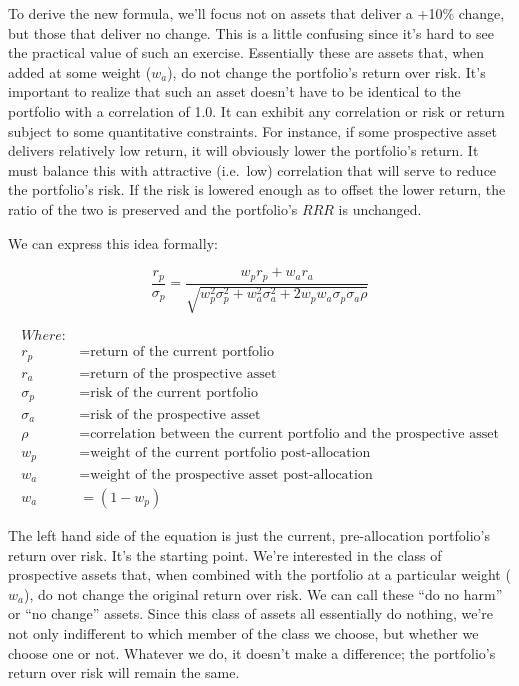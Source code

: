 \documentclass[]{article}
\begin{document}
To derive the new formula, we'll focus not on assets that deliver a
+10\% change, but those that deliver no change. This is a little
confusing since it's hard to see the practical value of such an
exercise. Essentially these are assets that, when added at some weight
(\(w_a\)), do not change the portfolio's return over risk. It's
important to realize that such an asset doesn't have to be identical to
the portfolio with a correlation of 1.0. It can exhibit any correlation
or risk or return subject to some quantitative constraints. For
instance, if some prospective asset delivers relatively low return, it
will obviously lower the portfolio's return. It must balance this with
attractive (i.e.~low) correlation that will serve to reduce the
portfolio's risk. If the risk is lowered enough as to offset the lower
return, the ratio of the two is preserved and the portfolio's \(RRR\) is
unchanged.

We can express this idea formally:

\[
\frac{r_p}{\sigma_p} = \frac{w_p r_p + w_a r_a}
{\sqrt{w_p^2 \sigma_p^2 + w_a^2 \sigma_a^2 + 2 w_p w_a \sigma_p \sigma_a \rho}}
\]

\[
\begin{aligned}
Where: & \\
r_p & = \text{return of the current portfolio} \\
r_a & = \text{return of the prospective asset} \\
\sigma_p & = \text{risk of the current portfolio} \\
\sigma_a & = \text{risk of the prospective asset} \\
\rho & = \text{correlation between the current portfolio and the prospective asset} \\
w_p & = \text{weight of the current portfolio post-allocation} \\
w_a & = \text{weight of the prospective asset post-allocation} \\
w_a & = (1 - w_p)
\end{aligned}
\]

The left hand side of the equation is just the current, pre-allocation
portfolio's return over risk. It's the starting point. We're interested
in the class of prospective assets that, when combined with the
portfolio at a particular weight (\(w_a\)), do not change the original
return over risk. We can call these ``do no harm'' or ``no change''
assets. Since this class of assets all essentially do nothing, we're not
only indifferent to which member of the class we choose, but whether we
choose one or not. Whatever we do, it doesn't make a difference; the
portfolio's return over risk will remain the same.
\end{document}
